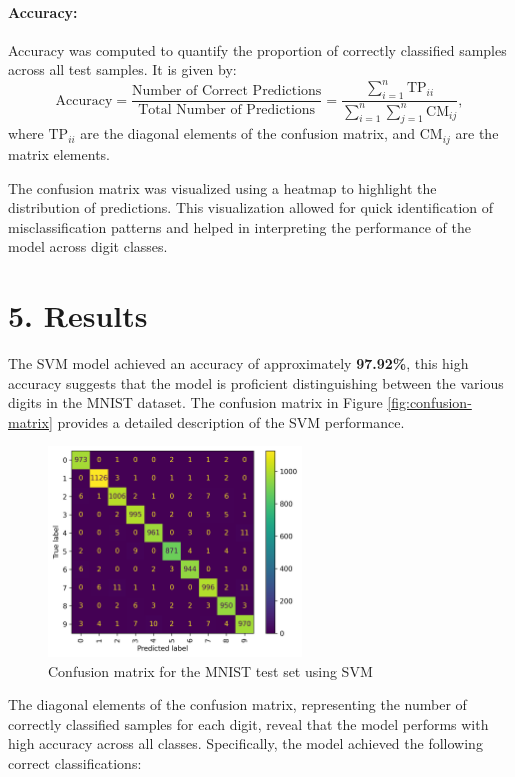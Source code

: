 \documentclass{article}
\begin{document}
\paragraph{Accuracy:}
Accuracy was computed to quantify the proportion of correctly classified samples across all test samples. It is given by:
\[
\text{Accuracy} = \frac{\text{Number of Correct Predictions}}{\text{Total Number of Predictions}} = \frac{\sum_{i=1}^{n} \text{TP}_{ii}}{\sum_{i=1}^{n} \sum_{j=1}^{n} \text{CM}_{ij}},
\]
where $\text{TP}_{ii}$ are the diagonal elements of the confusion matrix, and $\text{CM}_{ij}$ are the matrix elements.

\noindent
The confusion matrix was visualized using a heatmap to highlight the distribution of predictions. This visualization allowed for quick identification of misclassification patterns and helped in interpreting the performance of the model across digit classes.

\section*{5. Results}
The SVM model achieved an accuracy of approximately \textbf{97.92\%},   this high accuracy suggests that the model is proficient distinguishing between the various digits in the MNIST dataset. The confusion matrix in Figure \eqref{fig:confusion-matrix} provides a detailed description of the SVM performance. 

\begin{figure}[h!]
    \centering
    \includegraphics[width=0.6\textwidth]{confusionMatrix_SVM_MNIST.png} %
    \caption{Confusion matrix for the MNIST test set using SVM}
    \label{fig:confusion-matrix}
\end{figure}

\noindent
The diagonal elements of the confusion matrix, representing the number of correctly classified samples for each digit, reveal that the model performs with high accuracy across all classes. Specifically, the model achieved the following correct classifications:
\end{document}
